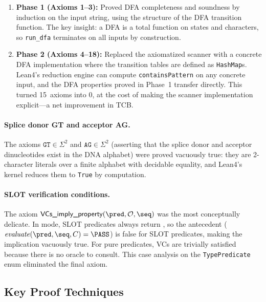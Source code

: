 \begin{enumerate}[leftmargin=*,itemsep=1pt,topsep=2pt]
\item \textbf{Phase 1 (Axioms 1--3):}
  Proved DFA completeness and soundness by induction on the input
  string, using the structure of the DFA transition function.
  The key insight: a DFA is a total function on states and characters,
  so \texttt{run\_dfa} terminates on all inputs by construction.

\item \textbf{Phase 2 (Axioms 4--18):}
  Replaced the axiomatized scanner with a concrete DFA implementation
  where the transition tables are defined as \texttt{HashMap}s.
  Lean4's reduction engine can compute \texttt{containsPattern} on any
  concrete input, and the DFA properties proved in Phase~1 transfer
  directly.
  This turned 15~axioms into 0, at the cost of making the scanner
  implementation explicit---a net improvement in TCB.
\end{enumerate}

\paragraph{Splice donor GT and acceptor AG.}
The axioms $\texttt{GT} \in \Sigma^2$ and $\texttt{AG} \in \Sigma^2$
(asserting that the splice donor and acceptor dinucleotides exist in the
DNA alphabet) were proved vacuously true: they are 2-character
literals over a finite alphabet with decidable equality, and Lean4's
kernel reduces them to \texttt{True} by computation.

\paragraph{SLOT verification conditions.}
The axiom
$\textsf{VCs\_imply\_property}(\pred, \mathcal{O}, \seq)$
was the most conceptually delicate.
In \CONSERVATIVE{} mode, SLOT predicates always return \UNCERTAIN,
so the antecedent ($\mathit{evaluate}(\pred, \seq, C) = \PASS$)
is false for SLOT predicates, making the implication vacuously true.
For pure predicates, VCs are trivially satisfied because there is no
oracle to consult.
This case analysis on the \texttt{TypePredicate} enum eliminated the
final axiom.

\subsection{Key Proof Techniques}\label{sec:proof-techniques}

